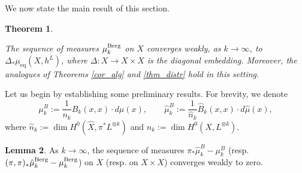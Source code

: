 \documentclass[12pt]{article}
\numberwithin{equation}{section}
\theoremstyle{theorem}
\newtheorem{thm}{Theorem}[section]
\theoremstyle{definition}
\newtheorem{lem}[thm]{Lemma}
\theoremstyle{remark}
\begin{document}
	We now state the main result of this section.
	\par 
	\begin{thm}\label{thm_sing}
	\begin{sloppypar}
		The sequence of measures $\mu_k^{\rm{Berg}}$ on $X$ converges weakly, as $k \to \infty$, to $\Delta_* \mu_{\mathrm{eq}}(X, h^L)$, where $\Delta: X \to X \times X$ is the diagonal embedding.
		Moreover, the analogues of Theorems \ref{cor_alg} and \ref{thm_distr} hold in this setting.
	\end{sloppypar}
	\end{thm}
	Let us begin by establishing some preliminary results.
	For brevity, we denote 
	\begin{equation}
		\mu_k^B := \frac{1}{n_k} B_k(x, x) \cdot d \mu(x), \qquad \hat{\mu}_k^B := \frac{1}{\hat{n}_k} \hat{B}_k(x, x) \cdot d \hat{\mu}(x),
	\end{equation}
	where $\hat{n}_k := \dim H^0(\hat{X}, \pi^* L^{\otimes k})$ and $n_k := \dim H^0(X, L^{\otimes k})$.
	\begin{lem}\label{lem_comp_res_meas}
		As $k \to \infty$, the sequence of measures $\pi_* \hat{\mu}_k^B - \mu_k^B$ (resp. $(\pi, \pi)_* \hat{\mu}_k^{\rm{Berg}} - \mu_k^{\rm{Berg}}$) on $X$ (resp. on $X \times X$) converges weakly to zero.
	\end{lem}
\end{document}
